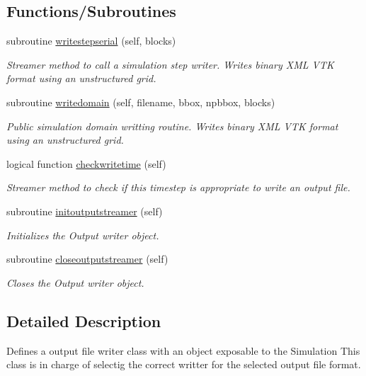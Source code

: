 \subsection*{Functions/\+Subroutines}
\begin{DoxyCompactItemize}
\item 
subroutine \mbox{\hyperlink{namespacesimulationoutputstreamer__mod_ac619e3f6f7ebc099c1e8298460f4f183}{writestepserial}} (self, blocks)
\begin{DoxyCompactList}\small\item\em Streamer method to call a simulation step writer. Writes binary X\+ML V\+TK format using an unstructured grid. \end{DoxyCompactList}\item 
subroutine \mbox{\hyperlink{namespacesimulationoutputstreamer__mod_a2c660b4331c576befebcf037b82b8d7a}{writedomain}} (self, filename, bbox, npbbox, blocks)
\begin{DoxyCompactList}\small\item\em Public simulation domain writting routine. Writes binary X\+ML V\+TK format using an unstructured grid. \end{DoxyCompactList}\item 
logical function \mbox{\hyperlink{namespacesimulationoutputstreamer__mod_a81b788c12b0520901e6fc9b113a10dec}{checkwritetime}} (self)
\begin{DoxyCompactList}\small\item\em Streamer method to check if this timestep is appropriate to write an output file. \end{DoxyCompactList}\item 
subroutine \mbox{\hyperlink{namespacesimulationoutputstreamer__mod_a9ab3e2101fbed18ea896729f7201e1aa}{initoutputstreamer}} (self)
\begin{DoxyCompactList}\small\item\em Initializes the Output writer object. \end{DoxyCompactList}\item 
subroutine \mbox{\hyperlink{namespacesimulationoutputstreamer__mod_adc0f21d337c283eee1f5f13b2eb51d52}{closeoutputstreamer}} (self)
\begin{DoxyCompactList}\small\item\em Closes the Output writer object. \end{DoxyCompactList}\end{DoxyCompactItemize}


\subsection{Detailed Description}
Defines a output file writer class with an object exposable to the Simulation This class is in charge of selectig the correct writter for the selected output file format. 

